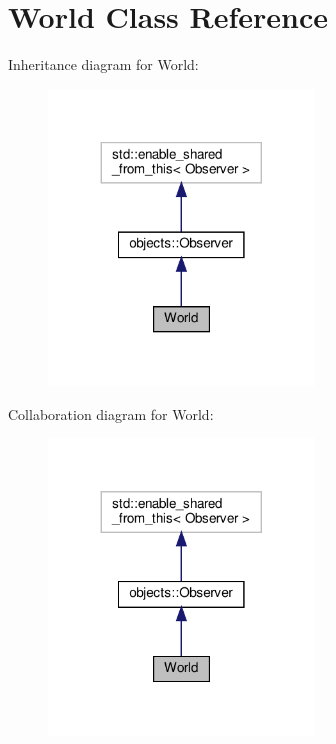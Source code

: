 \hypertarget{classWorld}{}\section{World Class Reference}
\label{classWorld}


Inheritance diagram for World\+:\nopagebreak
\begin{figure}[H]
\begin{center}
\leavevmode
\includegraphics[width=200pt]{classWorld__inherit__graph}
\end{center}
\end{figure}


Collaboration diagram for World\+:\nopagebreak
\begin{figure}[H]
\begin{center}
\leavevmode
\includegraphics[width=200pt]{classWorld__coll__graph}
\end{center}
\end{figure}
